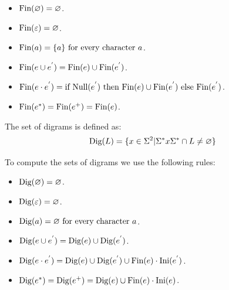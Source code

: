 \begin{itemize}
    \item $\textnormal{Fin}(\varnothing)=\varnothing$.                                                                                                         
    \item $\textnormal{Fin}(\varepsilon)=\varnothing$.                                                                                                         
    \item $\textnormal{Fin}(a)=\{a\} \textnormal{ for every character }a$.                                                                                     
    \item $\textnormal{Fin}(e \cup e^{'})=\textnormal{Fin}(e) \cup \textnormal{Fin}(e^{'})$.                                                                   
    \item $\textnormal{Fin}(e \cdot e^{'})=\textnormal{if Null}(e^{'}) \textnormal{ then Fin}(e)\cup\textnormal{Fin}(e^{'}) \textnormal{ else Fin}(e^{'})$.    
    \item $\textnormal{Fin}(e^{*})=\textnormal{Fin}(e^{+})=\textnormal{Fin}(e)$.                                                                               
\end{itemize}
\begin{definition}
    The set of digrams is defined as: 
    \[\textnormal{Dig}(L)=\{x \in \Sigma^{2} | \Sigma^{*}x\Sigma^{*} \cap L \neq \varnothing\}\]
\end{definition}
To compute the sets of digrams we use the following rules: 
\begin{itemize}
    \item $\textnormal{Dig}(\varnothing)=\varnothing$.                                                                                                     
    \item $\textnormal{Dig}(\varepsilon)=\varnothing$.                                                                                                       
    \item $\textnormal{Dig}(a)=\varnothing \textnormal{ for every character }a$.                                                                                   
    \item $\textnormal{Dig}(e \cup e^{'})=\textnormal{Dig}(e) \cup \textnormal{Dig}(e^{'})$.                                                                 
    \item $\textnormal{Dig}(e \cdot e^{'})=\textnormal{Dig}(e) \cup \textnormal{Dig}(e^{'}) \cup \textnormal{Fin}(e) \cdot \textnormal{Ini}(e^{'})$.    
    \item $\textnormal{Dig}(e^{*})=\textnormal{Dig}(e^{+})=\textnormal{Dig}(e) \cup \textnormal{Fin}(e) \cdot \textnormal{Ini}(e)$.                                                                 
\end{itemize}
